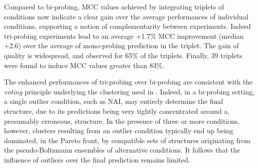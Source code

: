 \documentclass[a4,center,fleqn]{NAR}
\newcommand{\Software}[1]{\text{\ttfamily\bfseries #1}}
\newcommand{\OurTool}{\Software{IPANEMAP}\xspace}
\begin{document}
Compared to bi-probing, MCC values achieved by integrating triplets of conditions now indicate a clear gain over the average performances of individual conditions, supporting a notion of complementarity between experiments. Indeed tri-probing experiments lead to an average +1.7\% MCC improvement (median +2.6) over the average of mono-probing prediction in the triplet. The gain of quality is widespread, and observed for 65\% of the triplets. Finally, 39 triplets were found to induce MCC values greater than 83\%.

The enhanced performances of tri-probing over bi-probing are consistent with the \emph{voting} principle underlying the clustering used in \OurTool. Indeed, in a bi-probing setting, a single outlier condition, such as NAI, may entirely determine the final structure, due to its predictions being very tightly concentrated around a, presumably erroneous, structure. In the presence of three or more conditions, however, clusters resulting from an outlier condition typically end up being dominated, in the Pareto front, by compatible sets of structures originating from the pseudo-Boltzmann ensembles of alternative conditions. It follows that the influence of outliers over the final prediction remains limited.

\end{document}
